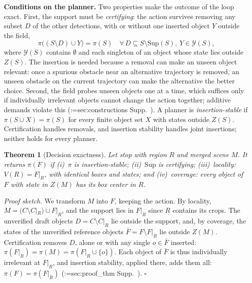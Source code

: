 \documentclass[10pt,twocolumn,letterpaper]{article}
\makeatletter
\newcommand{\draft}{C}            %
\newcommand{\full}{F}             %
\newcommand{\merged}{M}           %
\newcommand{\Sup}{\mathrm{Sup}}   %
\newcommand{\field}{Z}            %
\newcommand{\policy}{\pi}         %
\newtheorem{theorem}{Theorem}
\theoremstyle{definition}
\theoremstyle{remark}
\DeclareRobustCommand{\supp}[1]{\def\supp@list{}\@for\supp@i:=#1\do{\ifx\supp@list\@empty\edef\supp@list{S-\supp@i}\else\edef\supp@list{\supp@list,S-\supp@i}\fi}%
\edef\supp@cmd{\noexpand\Cref*{\supp@list}}Supp.~\supp@cmd}
\makeatother
\begin{document}
\noindent\textbf{Conditions on the planner.}
Two properties make the outcome of the loop exact.
First, the support must be \emph{certifying}: the action survives removing any subset $D$ of the other detections, with or without one inserted object $Y$ outside the field,
\begin{equation}
\policy\big((S\setminus D)\cup Y\big)=\policy(S)
\quad
\forall\, D\subseteq S\setminus\Sup(S),\ Y\in\mathcal{Y}(S),
\label{eq:support}
\end{equation}
where $\mathcal{Y}(S)$ contains $\emptyset$ and each singleton of an object whose state lies outside $\field(S)$.
The insertion is needed because a removal can make an unseen object relevant: once a spurious obstacle near an alternative trajectory is removed, an unseen obstacle on the current trajectory can make the alternative the better choice.
Second, the field probes unseen objects one at a time, which suffices only if individually irrelevant objects cannot change the action together; additive demands violate this (\supp{sec:constructions}).
A planner is \emph{insertion-stable} if
$\policy(S\cup X)=\policy(S)$
for every finite object set $X$ with states outside $\field(S)$.
Certification handles removals, and insertion stability handles joint insertions; neither holds for every planner.

\begin{theorem}[Decision exactness]
Let  stop with region $R$ and merged scene $\merged$.
It returns $\policy(\full)$ if (i)~$\policy$ is insertion-stable; (ii)~$\Sup$ is certifying; (iii)~\emph{locality}: $V(R)=\full|_R$, with identical boxes and states; and (iv)~\emph{coverage}: every object of $\full$ with state in $\field(\merged)$ has its box center in $R$.\label{thm:exact}
\end{theorem}

\noindent\emph{Proof sketch.}
We transform $\merged$ into $\full$, keeping the action.
By locality, $\merged=(\draft\setminus\draft|_R)\cup\full|_R$, and the support lies in $\full|_R$ since $R$ contains its crops.
The unverified draft objects $D=\draft\setminus\draft|_R$ lie outside the support, and, by coverage, the states of the unverified reference objects $\bar\full=\full\setminus\full|_R$ lie outside $\field(\merged)$.
Certification removes $D$, alone or with any single $o\in\bar\full$ inserted: $\policy(\full|_R)=\policy(\merged)=\policy(\full|_R\cup\{o\})$.
Each object of $\bar\full$ is thus individually irrelevant at $\full|_R$, and insertion stability, applied there, adds them all: $\policy(\full)=\policy(\full|_R)$ (\supp{sec:proof_thm}).
\hfill$\square$
\end{document}
